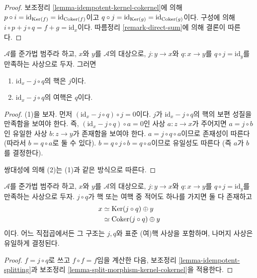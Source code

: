 \begin{proof}
보조정리 \ref{lemma-idempotent-kernel-cokernel}에 의해
$p \circ i = \text{id} _ {\mathop{\mathrm{Ker}} (f)} = \text{id} _ {\mathop{\mathrm{Coker}} (f)}$이고
$q \circ j = \text{id} _ {\mathop{\mathrm{Ker}} (g)} = \text{id} _ {\mathop{\mathrm{Coker}} (g)}$이다.
구성에 의해 $i \circ p + j \circ q = f + g = \text{id} _ x$이다.
따름정리 \ref{remark-direct-sum}에 의해 결론이 따른다.
\end{proof}

\begin{lemma}
\label{lemma-split-morphism-kernel-cokernel}
$\mathcal{A}$를 준가법 범주라 하고, $x$와 $y$를 $\mathcal{A}$의 대상으로,
$j : y \to x$와 $q : x \to y$를 $q \circ j = \text{id} _ y$를 만족하는
사상으로 두자. 그러면
\begin{enumerate}
\item $\text{id} _ x - j \circ q$의 핵은 $j$이다.
\item $\text{id} _ x - j \circ q$의 여핵은 $q$이다.
\end{enumerate}
\end{lemma}

\begin{proof}
(1)을 보자. 먼저 $(\text{id} _ x - j \circ q) \circ j = 0$이다.
$j$가 $\text{id} _ {x} - j \circ q$의 핵의 보편 성질을 만족함을 보여야 한다.
즉, $(\text{id} _ x - j \circ q) \circ a = 0$인 사상 $a : z \to x$가
주어지면 $a = j \circ b$인 유일한 사상 $b : z \to y$가 존재함을 보여야
한다. $a = j \circ q \circ a$이므로 존재성이 따른다
(따라서 $b = q \circ a$로 둘 수 있다).
$b = q \circ j \circ b = q \circ a$이므로 유일성도 따른다
(즉 $a$가 $b$를 결정한다).

\medskip\noindent
쌍대성에 의해 (2)는 (1)과 같은 방식으로 따른다.
\end{proof}

\begin{lemma}
\label{lemma-split-morphism-splitting}
$\mathcal{A}$를 준가법 범주라 하고, $x$와 $y$를 $\mathcal{A}$의 대상으로,
$j : y \to x$와 $q : x \to y$를 $q \circ j = \text{id} _ y$를 만족하는
사상으로 두자. $j \circ q$가 핵 또는 여핵 중 적어도 하나를 가지면
둘 다 존재하고
\begin{align*}
x
& \simeq \mathop{\mathrm{Ker}} (j \circ q) \oplus y \\
& \simeq \mathop{\mathrm{Coker}} (j \circ q) \oplus y
\end{align*}
이다. 어느 직접곱에서든 그 구조는 $j , q$와 표준 (여)핵 사상을 포함하며,
나머지 사상은 유일하게 결정된다.
\end{lemma}

\begin{proof}
$f = j \circ q$로 쓰고 $f \circ f = f$임을 계산한 다음,
보조정리 \ref{lemma-idempotent-splitting}과
보조정리 \ref{lemma-split-morphism-kernel-cokernel}을 적용한다.
\end{proof}




